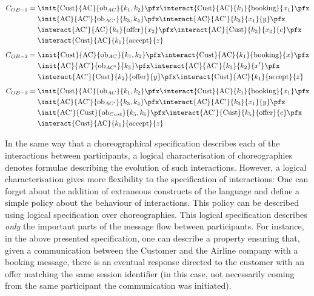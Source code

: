   \begin{align} \label{Logic4Struct:intro::example}
  C_{OB-1} = {} & \init{\text{Cust}}{\text{AC}}{\text{ob}_{AC}}{k_1,k_2} \pfx
  \interact{\text{Cust}}{\text{AC}}{k_1}{\text{booking}}{x_1} \pfx
  \notag \\
  & \init{\text{AC}}{\text{AC'}}{\text{ob}_{AC'}}{k_3,k_4} \pfx
  \interact{\text{AC}}{\text{AC'}}{k_3}{x_1}{y}  \pfx  \notag\\
  & \interact{\text{AC'}}{\text{AC}}{k_4}{\text{offer}}{x_2} \pfx
   \interact{\text{AC}}{\text{Cust}}{k_2}{x_2}{c}  \pfx \notag\\
   & \interact{\text{Cust}}{\text{AC}}{k_1}{\text{accept}}{z}
\end{align}
\begin{align}
  C_{OB-2} = {} & \init{\text{Cust}}{\text{AC}}{\text{ob}_{AC}}{k_1,k_2} \pfx
  \interact{\text{Cust}}{\text{AC}}{k_1}{\text{booking}}{x} \pfx
  \notag \\
  & \init{\text{AC}}{\text{AC'}}{\text{ob}_{AC'}}{k_3} \pfx
  \interact{\text{AC}}{\text{AC'}}{k_3}{k_2}{x'}  \pfx  \notag\\
  & \interact{\text{AC'}}{\text{Cust}}{k_2}{\text{offer}}{y} \pfx
  \interact{\text{Cust}}{\text{AC}}{k_1}{\text{accept}}{z} 
\end{align}
\begin{align}
  C_{OB-3} = {} & \init{\text{Cust}}{\text{AC}}{\text{ob}_{AC}}{k_1,k_2} \pfx
  \interact{\text{Cust}}{\text{AC}}{k_1}{\text{booking}}{x_1} \pfx
  \notag \\
  & \init{\text{AC}}{\text{AC'}}{\text{ob}_{AC'}}{k_3,k_4} \pfx
  \interact{\text{AC}}{\text{AC'}}{k_3}{x_1}{y}  \pfx  \notag\\
  & \init{\text{AC'}}{\text{Cust}}{\text{ob}_{Cust}}{k_5,k_6} \pfx
  \interact{\text{AC'}}{\text{Cust}}{k_5}{\text{offer}}{c} \pfx \notag\\
  & \interact{\text{Cust}}{\text{AC}}{k_1}{\text{accept}}{z}
  \end{align}




  In the same way that a choreographical specification describes each
  of the interactions between participants, a logical characterisation
  of choreographies denotes formulae describing the evolution of such
  interactions. However, a logical characterisation gives more
  flexibility to the specification of interactions: One can forget
  about the addition of extraneous constructs of the language and
  define a simple policy about the behaviour of interactions. This
  policy can be described using logical
  specification over choreographies.  This logical
  specification describes \emph{only} the important parts of the message flow
  between participants. For instance, in the above presented
  specification, one can describe a property ensuring that, given a
  communication between the Customer and the Airline company with a
  booking message, there is an eventual response directed to the
  customer with an offer matching the same session identifier (in
  this case, not necessarily coming from the same participant the
  communication was initiated).

